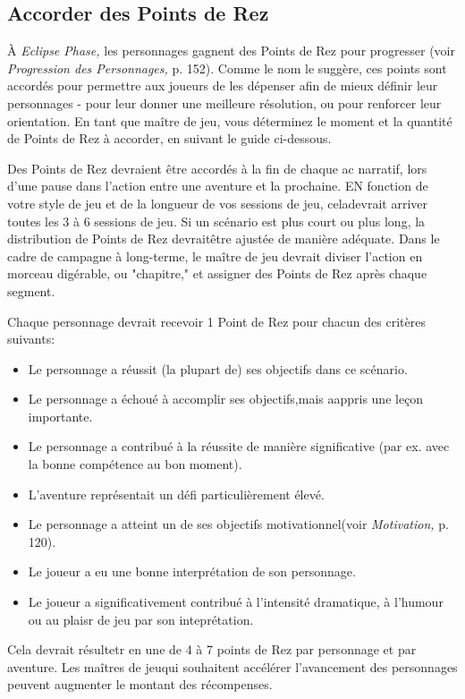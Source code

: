 {\subsection{Accorder des Points de Rez} 

À \textit{Eclipse Phase,} les personnages gagnent des Points de Rez pour progresser (voir \textit{Progression des Personnages,} p. 152). Comme le nom le suggère, ces points sont accordés pour permettre aux joueurs de les dépenser afin de mieux définir leur personnages - pour leur donner une meilleure résolution, ou pour renforcer leur orientation. En tant que maître de jeu, vous déterminez le moment et la quantité de Points de Rez à accorder, en suivant le guide ci-dessous. 

Des Points de Rez devraient être accordés à la fin de chaque ac narratif, lors d'une pause dans l'action entre une aventure et la prochaine. EN fonction de votre style de jeu et de la longueur de vos sessions de jeu, celadevrait arriver toutes les 3 à 6 sessions de jeu. Si un scénario est plus court ou plus long, la distribution de Points de Rez devraitêtre ajustée de manière adéquate. Dans le cadre de campagne à long-terme, le maître de jeu devrait diviser l'action en morceau digérable, ou "chapitre," et assigner des Points de Rez après chaque segment.  

Chaque personnage devrait recevoir 1 Point de Rez pour chacun des critères suivants: \begin{itemize}\itemLe personnage a participé auscénario. \item Le personnage a réussit (la plupart de) ses objectifs dans ce scénario. \item Le personnage a échoué à accomplir ses objectifs,mais aappris une leçon importante. \item Le personnage a contribué à la réussite de manière significative (par ex. avec la bonne compétence au bon moment). \item L'aventure représentait un défi particulièrement élevé. \item Le personnage a atteint un de ses objectifs motivationnel(voir \textit{Motivation,} p. 120). \item Le joueur a eu une bonne interprétation de son personnage. \item Le joueur a significativement contribué à l'intensité dramatique, à l'humour ou au plaisr de jeu par son inteprétation. \end{itemize} 

Cela devrait résultetr en une de 4 à 7 points de Rez par personnage et par aventure. Les maîtres de jeuqui souhaitent accélérer l'avancement des personnages peuvent augmenter le montant des récompenses. 

}
